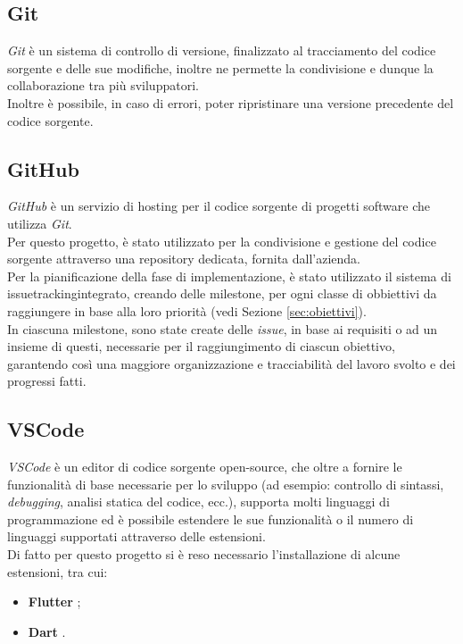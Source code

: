 \subsection*{Git}
\label{subsec:git}

\emph{Git} \cite{site:git} è un sistema di controllo di versione, finalizzato al tracciamento del codice sorgente e delle sue modifiche, inoltre ne permette la condivisione e dunque la collaborazione tra più sviluppatori.\\
Inoltre è possibile, in caso di errori, poter ripristinare una versione precedente del codice sorgente.

\subsection*{GitHub}
\label{subsec:github}

\emph{GitHub} \cite{site:github} è un servizio di hosting per il codice sorgente di progetti software che utilizza \emph{Git}.\\
Per questo progetto, è stato utilizzato per la condivisione e gestione del codice sorgente attraverso una repository dedicata, fornita dall'azienda.\\
Per la pianificazione della fase di implementazione, è stato utilizzato il sistema di \gls{issuetracking}\glsoccur integrato, creando delle \gls{milestone}\glsoccur, per ogni classe di obbiettivi da raggiungere in base alla loro priorità (vedi Sezione \ref{sec:obiettivi}).\\
In ciascuna \gls{milestone}\glsoccur, sono state create delle \emph{issue}, in base ai requisiti o ad un insieme di questi, necessarie per il raggiungimento di ciascun obiettivo, garantendo così una maggiore organizzazione e tracciabilità del lavoro svolto e dei progressi fatti.

\subsection*{VSCode}
\label{subsec:vscode}

\emph{VSCode} è un editor di codice sorgente \gls{open-source}\glsoccur, che oltre a fornire le funzionalità di base necessarie per lo sviluppo (ad esempio: controllo di sintassi, \emph{debugging}, analisi statica del codice, ecc.), supporta molti linguaggi di programmazione ed è possibile estendere le sue funzionalità o il numero di linguaggi supportati attraverso delle estensioni.\\
Di fatto per questo progetto si è reso necessario l'installazione di alcune estensioni, tra cui:
\begin{itemize}
    \item \textbf{Flutter} \cite{site:flutter-extension};
    \item \textbf{Dart} \cite{site:dart-extension}.
\end{itemize}

